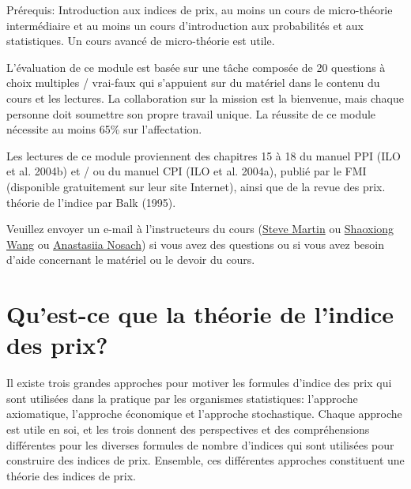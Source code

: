 \documentclass[
]{article}
\begin{document}
Prérequis: Introduction aux indices de prix, au moins un cours de micro-théorie intermédiaire et au moins un cours d'introduction aux probabilités et aux statistiques. Un cours avancé de micro-théorie est utile.

L'évaluation de ce module est basée sur une tâche composée de 20 questions à choix multiples / vrai-faux qui s'appuient sur du matériel dans le contenu du cours et les lectures. La collaboration sur la mission est la bienvenue, mais chaque personne doit soumettre son propre travail unique. La réussite de ce module nécessite au moins 65\% sur l'affectation.

Les lectures de ce module proviennent des chapitres 15 à 18 du manuel PPI (ILO et al. 2004b) et / ou du manuel CPI (ILO et al. 2004a), publié par le FMI (disponible gratuitement sur leur site Internet), ainsi que de la revue des prix. théorie de l'indice par Balk (1995).

Veuillez envoyer un e-mail à l'instructeurs du cours (\href{mailto:steve.martin5@canada.ca}{Steve Martin} ou \href{mailto:shaoxiong.wang@canada.ca}{Shaoxiong Wang} ou \href{mailto:anastasiia.nosach@canada.ca}{Anastasiia Nosach}) si vous avez des questions ou si vous avez besoin d'aide concernant le matériel ou le devoir du cours.

\hypertarget{quest-ce-que-la-thuxe9orie-de-lindice-des-prix}{%
\section{Qu'est-ce que la théorie de l'indice des prix?}\label{quest-ce-que-la-thuxe9orie-de-lindice-des-prix}}

Il existe trois grandes approches pour motiver les formules d'indice des prix qui sont utilisées dans la pratique par les organismes statistiques: l'approche axiomatique, l'approche économique et l'approche stochastique. Chaque approche est utile en soi, et les trois donnent des perspectives et des compréhensions différentes pour les diverses formules de nombre d'indices qui sont utilisées pour construire des indices de prix. Ensemble, ces différentes approches constituent une théorie des indices de prix.
\end{document}
